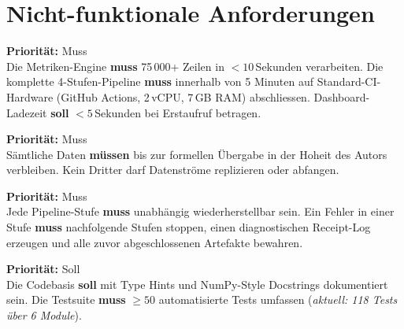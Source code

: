 \documentclass[12pt, a4paper, oneside]{report}
\begin{document}
\section{Nicht-funktionale Anforderungen}

\begin{reqbox}
\textbf{Priorit\"at:} Muss \\
Die Metriken-Engine \textbf{muss} 75\,000+ Zeilen in $< 10$\,Sekunden verarbeiten. Die komplette 4-Stufen-Pipeline \textbf{muss} innerhalb von 5 Minuten auf Standard-CI-Hardware (GitHub Actions, 2\,vCPU, 7\,GB RAM) abschliessen. Dashboard-Ladezeit \textbf{soll} $< 5$\,Sekunden bei Erstaufruf betragen.
\end{reqbox}

\vspace{6pt}

\begin{reqbox}
\textbf{Priorit\"at:} Muss \\
S\"amtliche Daten \textbf{m\"ussen} bis zur formellen \"Ubergabe in der Hoheit des Autors verbleiben. Kein Dritter darf Datenstr\"ome replizieren oder abfangen.
\end{reqbox}

\vspace{6pt}

\begin{reqbox}
\textbf{Priorit\"at:} Muss \\
Jede Pipeline-Stufe \textbf{muss} unabh\"angig wiederherstellbar sein. Ein Fehler in einer Stufe \textbf{muss} nachfolgende Stufen stoppen, einen diagnostischen Receipt-Log erzeugen und alle zuvor abgeschlossenen Artefakte bewahren.
\end{reqbox}

\vspace{6pt}

\begin{reqbox}
\textbf{Priorit\"at:} Soll \\
Die Codebasis \textbf{soll} mit Type Hints und NumPy-Style Docstrings dokumentiert sein. Die Testsuite \textbf{muss} $\geq 50$ automatisierte Tests umfassen (\textit{aktuell: 118 Tests \"uber 6 Module}).
\end{reqbox}

\vspace{6pt}
\end{document}
